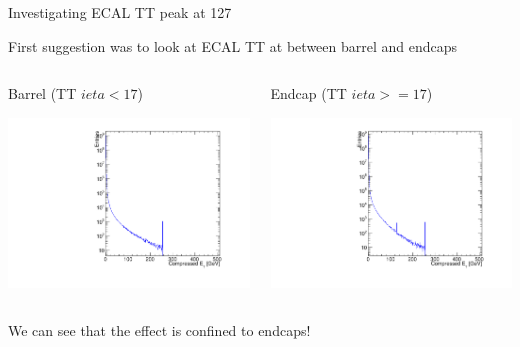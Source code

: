 \documentclass[8pt]{beamer}
\begin{document}
\begin{frame}{Investigating ECAL TT peak at 127}

First suggestion was to look at ECAL TT at between barrel and endcaps

\begin{columns}
 
\begin{block}{Barrel (TT $ieta<17$)}
\centering

\includegraphics[width=\linewidth]{fig/ECALTT_Barrel_CompressedEt.pdf}

\end{block}

\begin{block}{Endcap (TT $ieta>=17$)}
\centering

\includegraphics[width=\linewidth]{fig/ECALTT_Endcap_CompressedEt.pdf}

\end{block}

\end{columns}

We can see that the effect is confined to endcaps!

\end{frame}
\end{document}
